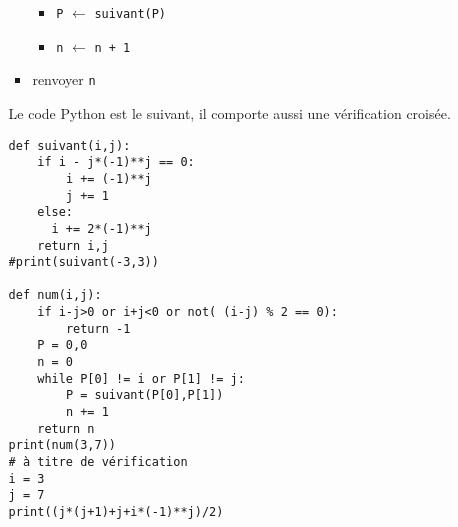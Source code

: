 \begin{enumerate}
\begin{enumerate}
\begin{itemize}
\begin{itemize}
    \item \verb|P| $\longleftarrow$ \verb|suivant(P)|
    \item \verb|n| $\longleftarrow$ \verb|n + 1|
  \end{itemize}
  \item renvoyer \verb|n|
\end{itemize}
Le code Python est le suivant, il comporte aussi une vérification croisée.
\begin{verbatim}
def suivant(i,j):
    if i - j*(-1)**j == 0:
        i += (-1)**j
        j += 1
    else:
      i += 2*(-1)**j
    return i,j
#print(suivant(-3,3))

def num(i,j):
    if i-j>0 or i+j<0 or not( (i-j) % 2 == 0):
        return -1
    P = 0,0
    n = 0
    while P[0] != i or P[1] != j:
        P = suivant(P[0],P[1])
        n += 1
    return n
print(num(3,7))
# à titre de vérification
i = 3
j = 7
print((j*(j+1)+j+i*(-1)**j)/2)
\end{verbatim}


\end{enumerate}
\end{enumerate}
